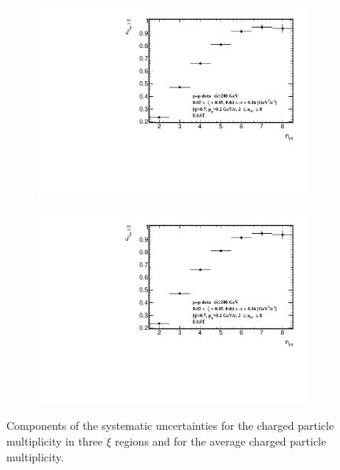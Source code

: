\begin{figure}[h!]
\begin{subfigure}{.49\textwidth}
		\includegraphics[width=\textwidth,page=101]{chapters/chrgSTAR/img/syst/outSD.pdf}
	\end{subfigure}
	\begin{subfigure}{.49\textwidth}
		\includegraphics[width=\textwidth,page=103]{chapters/chrgSTAR/img/syst/outSD.pdf}
	\end{subfigure}
	\caption{Components of the systematic uncertainties for the charged particle multiplicity in three $\xi$ regions and for the average charged particle multiplicity. }
	\label{fig:results_star_nch_syst}
\end{figure}

